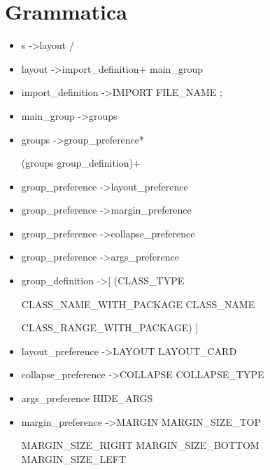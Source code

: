 \section{Grammatica}
\begin{itemize}
\item s   -\textgreater   layout  /

 \item layout   -\textgreater   import{\_}definition+	main{\_}group

 \item import{\_}definition   -\textgreater   IMPORT  FILE{\_}NAME  ;

 \item main{\_}group   -\textgreater   groups

 \item groups   -\textgreater   group{\_}preference*  
 
 (groups \textbar group{\_}definition)+

 \item group{\_}preference   -\textgreater   layout{\_}preference

 \item group{\_}preference   -\textgreater   margin{\_}preference

 \item group{\_}preference   -\textgreater   collapse{\_}preference

 \item group{\_}preference   -\textgreater   args{\_}preference

 \item group{\_}definition   -\textgreater   [  (CLASS{\_}TYPE   
 
 \textbar   CLASS{\_}NAME{\_}WITH{\_}PACKAGE   \textbar   CLASS{\_}NAME   
 
 \textbar   CLASS{\_}RANGE{\_}WITH{\_}PACKAGE)  ]

 \item layout{\_}preference   -\textgreater   LAYOUT  LAYOUT{\_}CARD

 \item collapse{\_}preference   -\textgreater   COLLAPSE  COLLAPSE{\_}TYPE

 \item args{\_}preference  HIDE{\_}ARGS

 \item margin{\_}preference   -\textgreater   MARGIN  MARGIN{\_}SIZE{\_}TOP  
 
 MARGIN{\_}SIZE{\_}RIGHT  MARGIN{\_}SIZE{\_}BOTTOM  MARGIN{\_}SIZE{\_}LEFT


\end{itemize}
